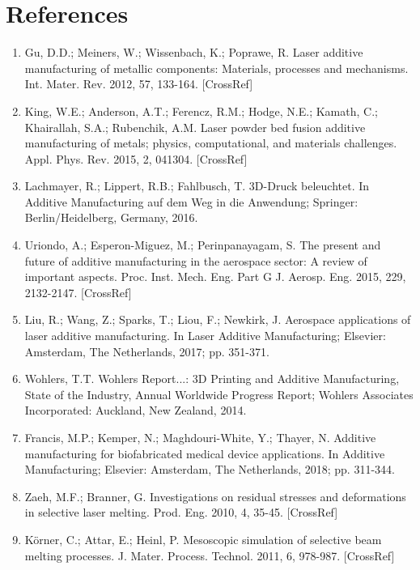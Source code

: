 \documentclass[10pt]{article}
\begin{document}
\section*{References }
\begin{enumerate}
  \item Gu, D.D.; Meiners, W.; Wissenbach, K.; Poprawe, R. Laser additive manufacturing of metallic components: Materials, processes and mechanisms. Int. Mater. Rev. 2012, 57, 133-164. [CrossRef]

  \item King, W.E.; Anderson, A.T.; Ferencz, R.M.; Hodge, N.E.; Kamath, C.; Khairallah, S.A.; Rubenchik, A.M. Laser powder bed fusion additive manufacturing of metals; physics, computational, and materials challenges. Appl. Phys. Rev. 2015, 2, 041304. [CrossRef]

  \item Lachmayer, R.; Lippert, R.B.; Fahlbusch, T. 3D-Druck beleuchtet. In Additive Manufacturing auf dem Weg in die Anwendung; Springer: Berlin/Heidelberg, Germany, 2016.

  \item Uriondo, A.; Esperon-Miguez, M.; Perinpanayagam, S. The present and future of additive manufacturing in the aerospace sector: A review of important aspects. Proc. Inst. Mech. Eng. Part G J. Aerosp. Eng. 2015, 229, 2132-2147. [CrossRef]

  \item Liu, R.; Wang, Z.; Sparks, T.; Liou, F.; Newkirk, J. Aerospace applications of laser additive manufacturing. In Laser Additive Manufacturing; Elsevier: Amsterdam, The Netherlands, 2017; pp. 351-371.

  \item Wohlers, T.T. Wohlers Report...: 3D Printing and Additive Manufacturing, State of the Industry, Annual Worldwide Progress Report; Wohlers Associates Incorporated: Auckland, New Zealand, 2014.

  \item Francis, M.P.; Kemper, N.; Maghdouri-White, Y.; Thayer, N. Additive manufacturing for biofabricated medical device applications. In Additive Manufacturing; Elsevier: Amsterdam, The Netherlands, 2018; pp. 311-344.

  \item Zaeh, M.F.; Branner, G. Investigations on residual stresses and deformations in selective laser melting. Prod. Eng. 2010, 4, 35-45. [CrossRef]

  \item Körner, C.; Attar, E.; Heinl, P. Mesoscopic simulation of selective beam melting processes. J. Mater. Process. Technol. 2011, 6, 978-987. [CrossRef]


\end{enumerate}
\end{document}
